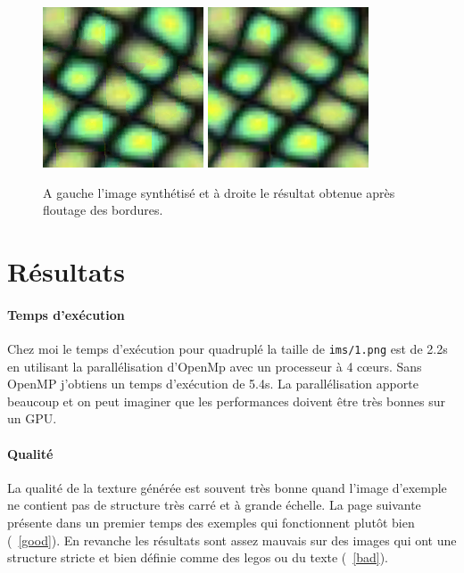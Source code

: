 \documentclass[12pt]{article}
\begin{document}
\begin{figure}
	\centering
	\includegraphics[scale=3]{bordure.png}
	\quad
	\includegraphics[scale=3]{flou.png}
	\captionsetup{justification=centering}
	\caption{A gauche l'image synthétisé et à droite le résultat obtenue après floutage des bordures.}
	\label{petit}
\end{figure}

\section{Résultats}

\paragraph{Temps d'exécution}
Chez moi le temps d'exécution pour quadruplé la taille de \verb|ims/1.png| est de 2.2s en utilisant la parallélisation d'OpenMp avec un processeur à 4 cœurs. Sans OpenMP j'obtiens un temps d'exécution de 5.4s. La parallélisation apporte beaucoup et on peut imaginer que les performances doivent être très bonnes sur un GPU.

\paragraph{Qualité}
La qualité de la texture générée est souvent très bonne quand l'image d'exemple ne contient pas de structure très carré et à grande échelle. La page suivante présente dans un premier temps des exemples qui fonctionnent plutôt bien (\figurename~\ref{good}). En revanche les résultats sont assez mauvais sur des images qui ont une structure stricte et bien définie comme des legos ou du texte (\figurename~\ref{bad}).
\end{document}
